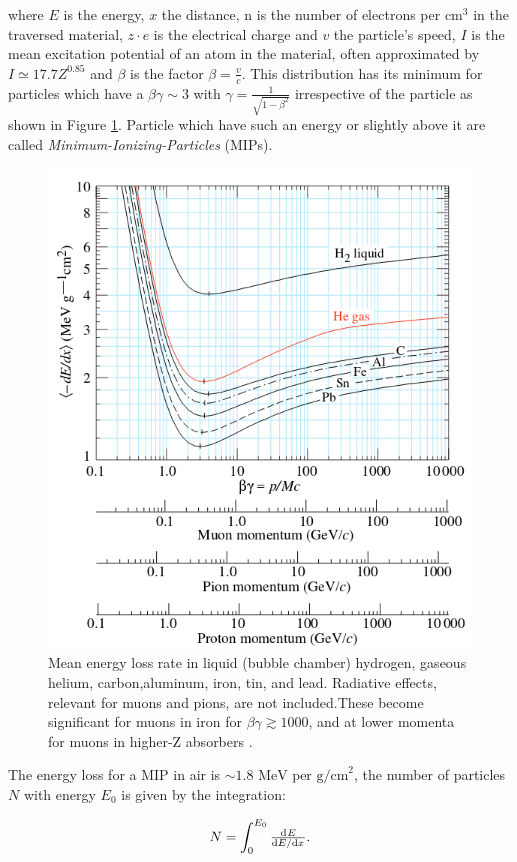 where $E$ is the energy, $x$ the distance, n is the number of electrons per $\text{cm}^3$ in the traversed material, $z \cdot e$ is the electrical charge and $v$ the particle's speed, $I$ is the mean excitation potential of an atom in the material, often approximated by $I\simeq 17.7 Z^{0.85}$ and $\beta$ is the factor $\beta = \frac{v}{c}$. This distribution has its minimum for particles which have a $\beta\gamma \sim 3$ with $\gamma=\frac{1}{\sqrt{1-\beta^2}}$ irrespective of the particle as shown in Figure \ref{fig:BB}. Particle which have such an energy or slightly above it are called \textit{Minimum-Ionizing-Particles} (MIPs).

\begin{figure}[htbp]
\centering
\includegraphics[width=0.7\linewidth]{./fig/BB.png}
\caption{Mean energy loss rate in liquid (bubble chamber) hydrogen, gaseous helium, carbon,aluminum, iron, tin, and lead. Radiative effects, relevant for muons and pions, are not included.These become significant for muons in iron for $\beta\gamma \gtrsim 1000$, and at lower momenta for muons in higher-Z absorbers \cite{Tanabashi:2018oca}.}
\label{fig:BB}
\end{figure}


The energy loss for a MIP in air is $\sim 1.8 \text{ MeV per g/cm}^2$, the number of particles $N$ with energy $E_0$ is given by the integration:

\begin{equation}
N=\int_0^{E_0}\od{E}{E/\text{d}x}.
\end{equation}


